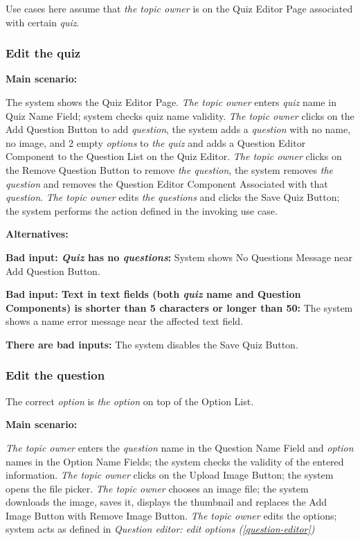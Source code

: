 \documentclass[
    english, %
]{VUMIFPSkursinis}
\begin{document}
\pagebreak

Use cases here assume that \textit{the topic owner} is on the Quiz Editor Page associated with certain \textit{quiz}.

\subsubsection{Edit the quiz}

\noindent\textbf{\fontsize{13}{15}\selectfont Main scenario:}

The system shows the Quiz Editor Page. \textit{The topic owner} enters \textit{quiz} name in Quiz Name Field; system checks quiz name validity. \textit{The topic owner} clicks on the Add Question Button to add \textit{question}, the system adds a \textit{question} with no name, no image, and 2 empty \textit{options} to \textit{the quiz} and adds a Question Editor Component to the Question List on the Quiz Editor. \textit{The topic owner} clicks on the Remove Question Button to remove \textit{the question}, the system removes \textit{the question} and removes the Question Editor Component Associated with that \textit{question}. \textit{The topic owner} edits \textit{the questions} and clicks the Save Quiz Button; the system performs the action defined in the invoking use case.

\noindent\textbf{\fontsize{13}{15}\selectfont Alternatives:}

\textbf{Bad input: \textit{Quiz} has no \textit{questions}:} System shows No Questions Message near Add Question Button.

\textbf{Bad input: Text in text fields (both \textit{quiz} name and Question Components) is shorter than 5 characters or longer than 50:} The system shows a name error message near the affected text field.

\textbf{There are bad inputs:} The system disables the Save Quiz Button.

\subsubsection{Edit the question}

The correct \textit{option} is \textit{the option} on top of the Option List.

\noindent\textbf{\fontsize{13}{15}\selectfont Main scenario:}

\textit{The topic owner} enters the \textit{question} name in the Question Name Field and \textit{option} names in the Option Name Fields; the system checks the validity of the entered information. \textit{The topic owner} clicks on the Upload Image Button; the system opens the file picker. \textit{The topic owner} chooses an image file; the system downloads the image, saves it, displays the thumbnail and replaces the Add Image Button with Remove Image Button. \textit{The topic owner} edits the options; system acts as defined in \textit{Question editor: edit options (\ref{question-editor})}
\end{document}
